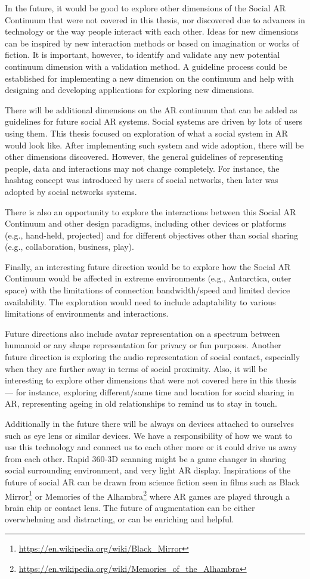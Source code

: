 In the future, it would be good to explore other dimensions of the Social AR Continuum that were not covered in this thesis, nor discovered due to advances in technology or the way people interact with each other. Ideas for new dimensions can be inspired by new interaction methods or based on imagination or works of fiction. It is important, however, to identify and validate any new potential continuum dimension with a validation method. A guideline process could be established for implementing a new dimension on the continuum and help with designing and developing applications for exploring new dimensions. 

There will be additional dimensions on the AR continuum that can be added as guidelines for future social AR systems. Social systems are driven by lots of users using them. This thesis focused on exploration of what a social system in AR would look like. After implementing such system and wide adoption, there will be other dimensions discovered. However, the general guidelines of representing people, data and interactions may not change completely. For instance, the hashtag concept was introduced by users of social networks, then later was adopted by social networks systems. 

There is also an opportunity to explore the interactions between this Social AR Continuum and other design paradigms, including other devices or platforms (e.g., hand-held, projected) and for different objectives other than social sharing (e.g., collaboration, business, play).

Finally, an interesting future direction would be to explore how the Social AR Continuum would be affected in extreme environments (e.g., Antarctica, outer space) with the limitations of connection bandwidth/speed and limited device availability. The exploration would need to include adaptability to various limitations of environments and interactions. 

Future directions also include avatar representation on a spectrum between humanoid or any shape representation for privacy or fun purposes. Another future direction is exploring the audio representation of social contact, especially when they are further away in terms of social proximity. Also, it will be interesting to explore other dimensions that were not covered here in this thesis — for instance, exploring different/same time and location for social sharing in AR, representing ageing in old relationships to remind us to stay in touch. 

Additionally in the future there will be always on devices attached to ourselves such as eye lens or similar devices. We have a responsibility of how we want to use this technology and connect us to each other more or it could drive us away from each other. Rapid 360-3D scanning might be a game changer in sharing social surrounding environment, and very light AR display. Inspirations of the future of social AR can be drawn from science fiction seen in films such as Black Mirror\footnote{\url{https://en.wikipedia.org/wiki/Black_Mirror}} or Memories of the Alhambra\footnote{\url{https://en.wikipedia.org/wiki/Memories_of_the_Alhambra}} where AR games are played through a brain chip or contact lens. The future of augmentation can be either overwhelming and distracting, or can be enriching and helpful.